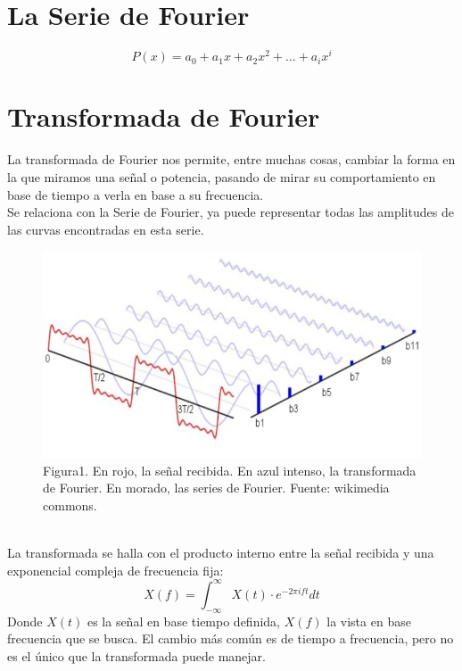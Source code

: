 \documentclass[review,1p]{elsarticle}
\begin{document}

\section{La Serie de Fourier}

\[
    P(x) = a_0 + a_1x + a_2x^2 + ...  + a_ix^i
\]

\section{Transformada de Fourier}
La transformada de Fourier nos permite, entre muchas cosas, cambiar la forma en 
la que miramos una señal o potencia, pasando de mirar su comportamiento en 
base de tiempo a verla en base a su frecuencia.\\
Se relaciona con la Serie de Fourier, ya puede representar todas las
amplitudes de las curvas encontradas en esta serie.\\
\begin{figure}[h]
    \centering
    \includegraphics[scale=0.5]{Figuras/Serie-transformada.jpg}
    \\
    \small Figura1. En rojo, la señal recibida. En azul intenso, la transformada
    de Fourier. En morado, las series de Fourier. Fuente: wikimedia commons.\\
\end{figure}\\
La transformada se halla con el producto interno entre la señal recibida y una
exponencial compleja de frecuencia fija:\\
\begin{equation}
    X(f) = \int_{- \infty}^{\infty} X(t) \cdot e^{-2\pi ift} dt 
\end{equation}
Donde $X(t)$ es la señal en base tiempo definida, $X(f)$ la vista en base frecuencia
que se busca. El cambio más común es de tiempo a frecuencia, pero no es el único que la 
transformada puede manejar.\\
\end{document}
